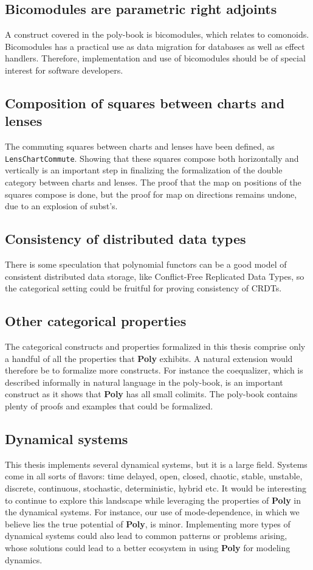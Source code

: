 \subsection{Bicomodules are parametric right adjoints}
A construct covered in the poly-book is bicomodules, which relates to comonoids. Bicomodules has a practical use as data migration for databases \cite{bicomodulesBlog} as well as effect handlers. Therefore, implementation and use of bicomodules should be of special interest for software developers.

\subsection{Composition of squares between charts and lenses}
The commuting squares between charts and lenses have been defined, as \texttt{LensChartCommute}. Showing that these squares compose both horizontally and vertically is an important step in finalizing the formalization of the double category between charts and lenses. The proof that the map on positions of the squares compose is done, but the proof for map on directions remains undone, due to an explosion of subst's.

\subsection{Consistency of distributed data types}

There is some speculation that polynomial functors can be a good model of consistent distributed data storage, like Conflict-Free Replicated Data Types, so the categorical setting could be fruitful for proving consistency of CRDTs.

\subsection{Other categorical properties}
The categorical constructs and properties formalized in this thesis comprise only a handful of all the properties that \textbf{Poly} exhibits. A natural extension would therefore be to formalize more constructs. For instance the coequalizer, which is described informally in natural language in the poly-book, is an important construct as it shows that \textbf{Poly} has all small colimits. The poly-book contains plenty of proofs and examples that could be formalized. 

\subsection{Dynamical systems}
This thesis implements several dynamical systems, but it is a large field. Systems come in all sorts of flavors: time delayed, open, closed, chaotic, stable, unstable, discrete, continuous, stochastic, deterministic, hybrid etc. It would be interesting to continue to explore this landscape while leveraging the properties of \textbf{Poly} in the dynamical systems. For instance, our use of mode-dependence, in which we believe lies the true potential of \textbf{Poly}, is minor. Implementing more types of dynamical systems could also lead to common patterns or problems arising, whose solutions could lead to a better ecosystem in using \textbf{Poly} for modeling dynamics.

